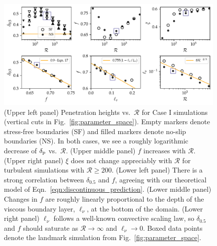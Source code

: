 \documentclass[twocolumn]{aastex631}
\newcommand{\delp}{\ensuremath{\delta_{\rm{p}}}}
\newcommand{\mR}{\ensuremath{\mathcal{R}}}
\begin{document}
\begin{figure}[t]
\centering
\includegraphics[width=\textwidth]{parameters_vs_re.pdf}
\caption{
(Upper left panel) Penetration heights vs.~$\mR$ for Case I simulations (vertical cuts in Fig.~\ref{fig:parameter_space}).
Empty markers denote stress-free boundaries (SF) and filled markers denote no-slip boundaries (NS).
In both cases, we see a roughly logarithmic decrease of $\delp$ vs.~$\mR$.
(Upper middle panel) $f$ increases with $\mR$.
(Upper right panel) $\xi$ does not change appreciably with $\mR$ for turbulent simulations with $\mR \geq 200$.
(Lower left panel) There is a strong correlation between $\delta_{0.5}$ and $f$, agreeing with our theoretical model of Eqn.~\ref{eqn:discontinuous_prediction}.
(Lower middle panel) Changes in $f$ are roughly linearly proportional to the depth of the viscous boundary layer, $\ell_\nu$, at the bottom of the domain.
(Lower right panel) $\ell_\nu$ follows a well-known convective scaling law, so $\delta_{0.5}$ and $f$ should saturate as $\mR \rightarrow \infty$ and $\ell_{\nu} \rightarrow 0$.
Boxed data points denote the landmark simulation from Fig.~\ref{fig:parameter_space}.
\label{fig:parameters_vs_re}
}
\end{figure}
\end{document}
